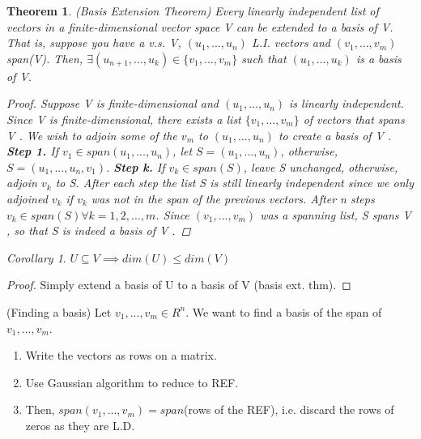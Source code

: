 \documentclass[12pt]{article}
\newtheorem{theorem}{Theorem}[section]
\theoremstyle{definition}
\theoremstyle{remark}
\newtheorem{corollary}{Corollary}[theorem]
\begin{document}
    \begin{theorem}(Basis Extension Theorem)
        Every linearly independent list of vectors in a
        finite-dimensional vector space V can be extended to a basis of V. That is, suppose you have 
        a v.s. V, $(u_1,...,u_n)$ L.I. vectors and $(v_1,...,v_m)$ span(V). Then, $\exists (u_{n+1},...,u_k) \in \{v_1,...,v_m\}$
        such that $(u_1,...,u_k)$ is a basis of V.
        \begin{proof}
            Suppose V is finite-dimensional and $(u_1,...,u_n)$ is linearly independent. Since V is
            finite-dimensional, there exists a list $\{v_1,...,v_m\}$ of vectors that spans V . We wish to adjoin
            some of the $v_m$ to $(u_1,...,u_n)$ to create a basis of V .
            \newline
            \textbf{Step 1.} If $v_1 \in span(u_1,...,u_n)$, let $S=(u_1,...,u_n)$, otherwise, $S=(u_1,...,u_n,v_1)$.
            \newline 
            \textbf{Step k.} If $v_k \in span(S)$, leave S unchanged, otherwise, adjoin $v_k$ to S.
            \newline
            After each step the list S is still linearly independent since we only adjoined $v_k$ if $v_k$ was
            not in the span of the previous vectors. After n steps $v_k \in span(S) \forall k = 1, 2, . . ., m$.
            Since $(v_1, . . ., v_m)$ was a spanning list, S spans V , so that S is indeed a basis of V .
        \end{proof}
        
    \end{theorem}

    \begin{corollary}
        $U\subseteq V \implies dim(U)\le dim(V)$
        \begin{proof}
            Simply extend a basis of U to a basis of V (basis ext. thm).
        \end{proof}
    \end{corollary}

    \begin{proposition}(Finding a basis)
        Let $v_1,..., v_m \in R^n$. We want to find a basis of the span of $v_1,..., v_m$. 
        \begin{enumerate}
            \item Write the vectors as rows on a matrix. 
            \item Use Gaussian algorithm to reduce to REF. 
            \item Then, $span(v_1,..., v_m) = span$(rows of the REF), i.e. discard the rows of 
            zeros as they are L.D.
        \end{enumerate}
    \end{proposition}
\end{document}
